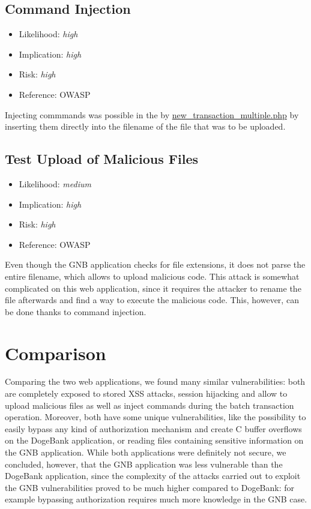 \subsection{Command Injection} \label{over:command_injection}
\begin{itemize}
	\item Likelihood: \textit{high}
	\item Implication: \textit{high}
	\item Risk: \textit{high}
	\item Reference: OWASP 
\end{itemize}
Injecting commmands was possible in the by \url{new\_transaction\_multiple.php} by inserting them directly into the filename of the file that was to be uploaded.

\subsection{Test Upload of Malicious Files} \label{over:maliciousgnb}
\begin{itemize}
	\item Likelihood: \textit{medium}
	\item Implication: \textit{high}
	\item Risk: \textit{high}
	\item Reference: OWASP 
\end{itemize}
Even though the GNB application checks for file extensions, it does not parse the entire filename, which allows to upload malicious code. This attack is somewhat complicated on this web application, since it requires the attacker to rename the file afterwards and find a way to execute the malicious code. This, however, can be done thanks to command injection.
	
\section{Comparison}
Comparing the two web applications, we found many similar vulnerabilities: both are completely exposed to stored XSS attacks, session hijacking and allow to upload malicious files as well as inject commands during the batch transaction operation.\newline
Moreover, both have some unique vulnerabilities, like the possibility to easily bypass any kind of authorization mechanism and create C buffer overflows on the DogeBank application, or reading files containing sensitive information on the GNB application.\newline
While both applications were definitely not secure, we concluded, however, that the GNB application was less vulnerable than the DogeBank application, since the complexity of the attacks carried out to exploit the GNB vulnerabilities proved to be much higher compared to DogeBank: for example bypassing authorization requires much more knowledge in the GNB case.
